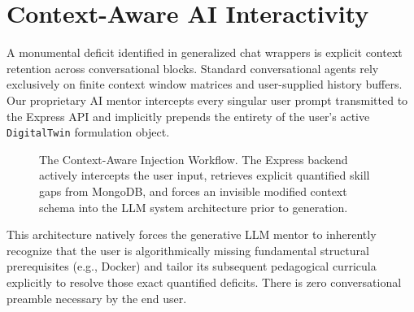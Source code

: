 \documentclass[conference]{IEEEtran}
\begin{document}
\section{Context-Aware AI Interactivity}
A monumental deficit identified in generalized chat wrappers is explicit context retention across conversational blocks. Standard conversational agents rely exclusively on finite context window matrices and user-supplied history buffers. Our proprietary AI mentor intercepts every singular user prompt transmitted to the Express API and implicitly prepends the entirety of the user's active \texttt{DigitalTwin} formulation object.

\begin{figure}[!ht]
\centering
{}
\caption{The Context-Aware Injection Workflow. The Express backend actively intercepts the user input, retrieves explicit quantified skill gaps from MongoDB, and forces an invisible modified context schema into the LLM system architecture prior to generation.}
\label{fig:mentor}
\end{figure}

This architecture natively forces the generative LLM mentor to inherently recognize that the user is algorithmically missing fundamental structural prerequisites (e.g., Docker) and tailor its subsequent pedagogical curricula explicitly to resolve those exact quantified deficits. There is zero conversational preamble necessary by the end user.
\end{document}
